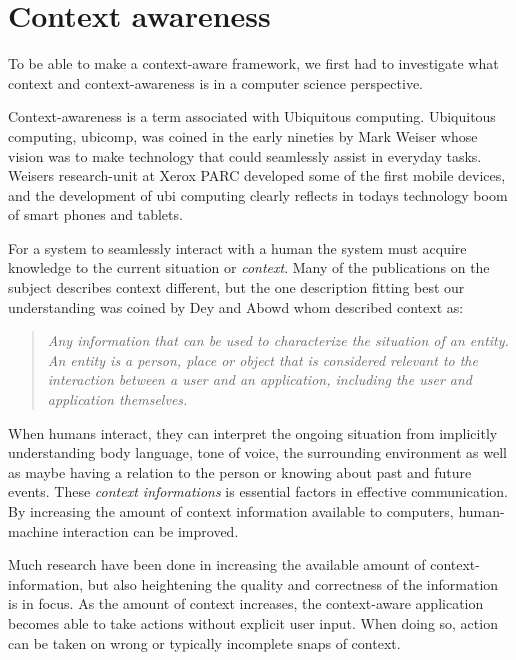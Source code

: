 \documentclass[../report.tex]{subfiles}
\begin{document}
\graphicspath{{img/}{../img/}}
\section{Context awareness}
\label{sec:Context awareness}
To be able to make a context-aware framework, we first had to investigate what context and context-awareness is in a computer science perspective.

Context-awareness is a term associated with Ubiquitous computing. Ubiquitous computing, ubicomp, was coined in the early nineties by Mark Weiser whose vision was to make technology that could seamlessly assist in everyday tasks. Weisers research-unit at Xerox PARC developed some of the first mobile devices, and the development of ubi computing clearly reflects in todays technology boom of smart phones and tablets.

For a system to seamlessly interact with a human the system must acquire knowledge to the current situation or \textit{context}. Many of the publications on the subject describes context different, but the one description fitting best our understanding was coined by Dey and Abowd whom described context as:

\blockquote{\textit{Any information that can be used to characterize the situation of an entity. An entity is a person, place or object that is considered relevant to the interaction between a user and an application, including the user and application themselves.}} \cite{Dey and Abowd (2000)} 

When humans interact, they can interpret the ongoing situation from implicitly understanding body language, tone of voice, the surrounding environment as well as maybe having a relation to the person or knowing about past and future events. These \textit{context informations} is essential factors in effective communication. By increasing the amount of context information available to computers, human-machine interaction can be improved.\\



Much research have been done in increasing the available amount of context-information, but also heightening the quality and correctness of the information is in focus. As the amount of context increases, the context-aware application becomes able to take actions without explicit user input. When doing so, action can be taken on wrong or typically incomplete snaps of context. 
\end{document}
